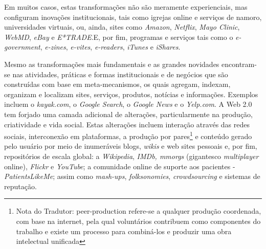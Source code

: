 Em muitos casos, estas transformações não são meramente experienciais,
mas configuram inovações institucionais, tais como igrejas online e
serviços de namoro, universidades virtuais, ou, ainda, sites como
\emph{Amazon}, \emph{Netflix}, \emph{Mayo Clinic}, \emph{WebMD},
\emph{eBay} e \emph{E*TRADE}.E, por fim, programas e serviços tais como
o \emph{e-government}, \emph{e-zines}, \emph{e-vites}, \emph{e-readers},
\emph{iTunes} e \emph{iShares}.

Mesmo as transformações mais fundamentais e as grandes novidades
encontram-se nas atividades, práticas e formas institucionais e de
negócios que são construídas com base em meta-mecanismos, os quais
agregam, indexam, organizam e localizam sites, serviços, produtos,
notícias e informações. Exemplos incluem o \emph{kayak.com}, o
\emph{Google Search}, o \emph{Google News} e o \emph{Yelp.com}. A Web
2.0 tem forjado uma camada adicional de alterações, particularmente na
produção, criatividade e vida social. Estas alterações incluem interação
através das redes sociais, interconexão em plataformas, a produção por
pares\footnote{Nota do Tradutor: peer-production refere-se a qualquer
  produção coordenada, com base na internet, pela qual voluntários
  contribuem como componentes do trabalho e existe um processo para
  combiná-los e produzir uma obra intelectual unificada} e conteúdo
gerado pelo usuário por meio de inumeráveis blogs, \emph{wikis} e web
sites pessoais e, por fim, repositórios de escala global: a
\emph{Wikipedia}, \emph{IMDb, mmorgs} (gigantesco \emph{multiplayer}
online), \emph{Flickr} e \emph{YouTube}; a comunidade online de suporte
aos pacientes - \emph{PatientsLikeMe}; assim como \emph{mash-ups},
\emph{folksonomies}, \emph{crowdsourcing} e sistemas de reputação.

